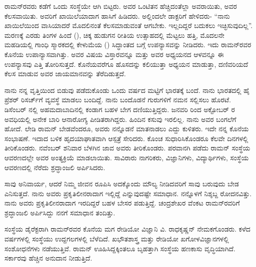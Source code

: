 ರಾಮನ್‍ರವರು ಕಡೆಗೆ ಒಂದು ಸಂಸ್ಥೆಯೇ ಆಗಿ ಬಿಟ್ಟರು. ಅವರ ಒಂಟಿತನ ಹೆಚ್ಚಿದಂತೆಲ್ಲಾ ಅವರಾಯಿತು, ಅವರ ಕೆಲಸವಾಯಿತು. ಅವರಿಗೆ ಖಾಯಿಲೆಯಾದಾಗ ಹಾಸಿಗೆ ಹಿಡಿದರು. ಅಲ್ಲಿಂದಲೇ ಡಾಕ್ಟರಿಗೆ ಹೇಳಿದರು- “ನಾನು ಖಾಯಿಲೆಯಿಂದ ವಾಸಿಯಾದರೆ ಮೊದಲಿನಂತೆ ಕೆಲಸಮಾಡುವಂತೆ ಆಗಬೇಕು. ಇಲ್ಲದಿದ್ದರೆ ಬದುಕಲು ಇಚ್ಛಿಸುವುದಿಲ್ಲ”. ಮರಣಕ್ಕೆ ಎರಡು ತಿಂಗಳ ಹಿಂದೆ (), ಚಿಕ್ಕ ಹುಡುಗನ ರೀತಿಯ ಉತ್ಸಾಹದಲ್ಲಿ ಮೆಟ್ಟಲು ಹತ್ತಿ, ಮೊದಲನೇ ಮಹಡಿಯಲ್ಲಿ ಗಾಂಧಿ ಸ್ಮಾರಕದಲ್ಲಿ ಕೇಳುಮೆಯ () ಸಿದ್ಧಾಂತದ ಬಗ್ಗೆ ಉಪನ್ಯಾಸವನ್ನು ನೀಡಿದರು. ಇದು ರಾಮನ್‍ರವರ ಕೊನೆಯ ಉಪಾನ್ಯಾಸವಾಗಿತ್ತು. ಅವರ ವಿಷಯ ವಿಸ್ತಾರವನ್ನೂ ಮತ್ತು ಅವರ ಅಧ್ಯಯನದ ಆಳವನ್ನೂ ಈ ಉಪನ್ಯಾಸವು ಎತ್ತಿ ತೋರಿಸುತ್ತದೆ. ಕೊನೆಯವರೆಗೂ ಹೊಸದನ್ನು ಕಲಿಯುತ್ತಾ ಅಧ್ಯಯನ ಮಾಡುತ್ತಾ, ದಣಿವರಿಯದೆ ಕೆಲಸ ಮಾಡುವ ಅವರ ಜಾಯಮಾನವನ್ನು ತೆರೆದಿಡುತ್ತದೆ.

ನಾನು ನನ್ನ ವೃತ್ತಿಯಿಂದ ಬಿಡುವು ಪಡೆದುಕೊಂಡು ಒಂದು ವರ್ಷದ ಮಟ್ಟಿಗೆ ಭಾರತಕ್ಕೆ ಬಂದೆ. ನಾನು ಭಾರತದಲ್ಲಿ ಹೈ ಪ್ರೆಶರ್ ರಿಸರ್ಚ್‌ಗೆ ವ್ಯವಸ್ಥೆ ಮಾಡಲು ಬಂದಿದ್ದೆ. ನಾನು ಬಂದೊಡನೆ ಗುರುಗಳಿಗೆ ನಮನ ಸಲ್ಲಿಸಲು ಹೊರಟೆ.  ಡಿಸೆಂಬರ್ ನಲ್ಲಿ ಅಹಮದಾಬಾದಿನಲ್ಲಿ ಕಂಡಾಗ ಬಹಳ ಬೇಗ ದಣಿಯುತ್ತಿದ್ದರು. ಜನವರಿ  ರಿಂದ ಅಕ್ಟೋಬರ್  ರ ಅವಧಿಯಲ್ಲಿ ಅನೇಕ ಬಾರಿ ಆನಾರೋಗ್ಯ ಪೀಡಿತರಾಗಿದ್ದರು. ಹಿಂದಿನ ಕಸುವು ಇರಲಿಲ್ಲ. ನಾನು ಅವರ ಬಂಗಲೆಗೆ ಹೋದೆ. ಲೇಡಿ ರಾಮನ್ ಬೇಡವೆಂದರೂ, ಅವರು ನನ್ನೊಡನೆ ಮಾತನಾಡಲು ಎದ್ದು ಕುಳಿತರು. ಇದೇ ನನ್ನ ಕೊನೆಯ ಸಂಭಾಷಣೆ. ಇದಾದ ಬಳಿಕ ಹೃದಯಾಘಾತವಾಗಿ ಆಸ್ಪತ್ರೆ ಸೇರಿದರು. ಕೊಂಚ ಸುಧಾರಿಸಿಕೊಂಡರೂ ಕೆಲವೇ ದಿನಗಳಲ್ಲಿ ತೀರಿಕೊಂಡರು. ನವೆಂಬರ್  ಶನಿವಾರ ಬೆಳಗಿನ ಜಾವ ಅವರು ತೀರಿಕೊಂಡರು. ಪರವಾನಗಿ ಪಡೆದು ರಾಮನ್ ಸಂಸ್ಥೆಯ ಆವರಣದಲ್ಲೇ ಅವರ ಅಂತ್ಯಕ್ರಿಯೆ ಮಾಡಲಾಯಿತು. ಸಾವಿರಾರು ನಾಗರಿಕರು, ವಿಜ್ಞಾನಿಗಳು, ವಿದ್ಯಾರ್ಥಿಗಳು, ಸಂಸ್ಥೆಯ ಆವರಣದಲ್ಲಿ ನೆರೆದು ಶ್ರದ್ಧಾಂಜಲಿ ಅರ್ಪಿಸಿದರು.

ಸಾವು ಅನಿವಾರ್ಯ, ಆದರೆ ನಿಮ್ಮ ಜೀವನ ರೂಪಿಸಿ ಅದಕ್ಕೊಂದು ಮೌಲ್ಯ ನೀಡಿದವರಿಗೆ ಸಾವು ಬರುವುದು ಬೇಡ ಎನಿಸುತ್ತದೆ. ನಾನು ಅವರು ಪ್ರಕೃತಿಲೀನರಾದಾಗ ಇಲ್ಲಿದ್ದೆ ಎನ್ನುವುದಷ್ಟೇ ಸಮಾಧಾನ. ನನ್ನೊಳಗೆ ನಿಶ್ಶಬ್ದ ರೋದನವಿತ್ತು. ನಾನು ಅವರು ಪ್ರಕೃತಿಲೀನರಾದಾಗ ಇರದಿದ್ದರೆ ಬಹಳ ಬೇಸರ ಪಡುತ್ತಿದ್ದೆ. ಚಂದ್ರಶೇಖರ ವೆಂಕಟ ರಾಮನ್‍ರವರಿಗೆ ಶ್ರದ್ಧಾಂಜಲಿ ಅರ್ಪಿಸಿದ್ದು ನನಗೆ ಸಮಾಧಾನ ತಂದಿತ್ತು.

ಸಂಸ್ಥೆಯ ಡೈರೆಕ್ಟರಾಗಿ ರಾಮನ್‍ರವರ ಕೊನೆಯ ಮಗ ರೇಡಿಯೋ ವಿಜ್ಞಾನಿ ವಿ. ರಾಧಕೃಷ್ಣನ್ ನೇಮಕಗೊಂಡರು. ಕಳೆದ  ವರ್ಷಗಳಲ್ಲಿ ಸಂಸ್ಥೆಯು ಉದ್ದಗಲಗಳಲ್ಲಿ ಬೆಳೆದಿದೆ. ಖಭೌತಶಾಸ್ತ್ರ ಮತ್ತು ರೇಡಿಯೋ ಖಗೋಳವಿಜ್ಞಾನಗಳಲ್ಲಿ ಸಂಶೋಧನೆಗಳು ನಡೆಯುತ್ತಿವೆ. ರಾಮನ್ ಊಹಿಸಿದ್ದಕ್ಕಿಂತಲೂ ಬೃಹತ್ತಾಗಿ ಸಂಸ್ಥೆಯ ಹಣಕಾಸು ವೃದ್ಧಿಯಾಗಿದೆ. ಸರ್ಕಾರವು ಹೆಚ್ಚಿನ ಅನುದಾನ ನೀಡುತ್ತಿದೆ.

